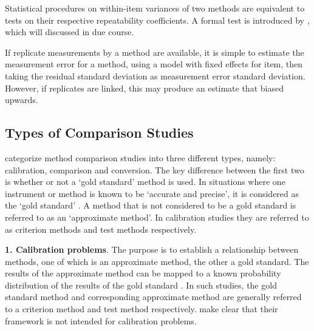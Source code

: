 \documentclass[12pt, a4paper]{report}
\theoremstyle{plain}
\theoremstyle{definition}
\theoremstyle{remark}
\begin{document}
	
		
Statistical procedures on within-item variances of two methods are equivalent to tests on their respective repeatability coefficients. A formal test is introduced by \citet{ARoy2009}, which will discussed in due course.
		
	
	If replicate measurements by a method are available, it is simple to estimate the measurement error for a method, using a model with fixed effects for item, then taking the residual standard deviation as measurement error standard deviation. However, if replicates are linked, this may produce an estimate that biased upwards.
	
	

	
	

		
	
	
	
	
	



	
	
	
	
	
	
	
	
	
	
	
	\subsection{Types of Comparison Studies}
	\citet{lewis1991} categorize method comparison studies into three
	different types, namely: calibration, comparison and conversion. The key difference between the first two is
	whether or not a `gold standard' method is used. In situations
	where one instrument or method is known to be `accurate and
	precise', it is considered as the `gold standard' \citep{lewis1991}. A
	method that is not considered to be a gold standard is referred to
	as an `approximate method'. In calibration studies they are
	referred to as criterion methods and test methods respectively.\\
	
	\smallskip
	
	\textbf{1. Calibration problems}. The purpose is to establish a
	relationship between methods, one of which is an approximate
	method, the other a gold standard. The results of the approximate
	method can be mapped to a known probability distribution of the
	results of the gold standard \citep{lewis1991}. In such studies, the
	gold standard method and corresponding approximate method are
	generally referred to a criterion method and test method
	respectively. \citet*{BA83} make clear that their framework is
	not intended for calibration problems.\\
	
\end{document}
